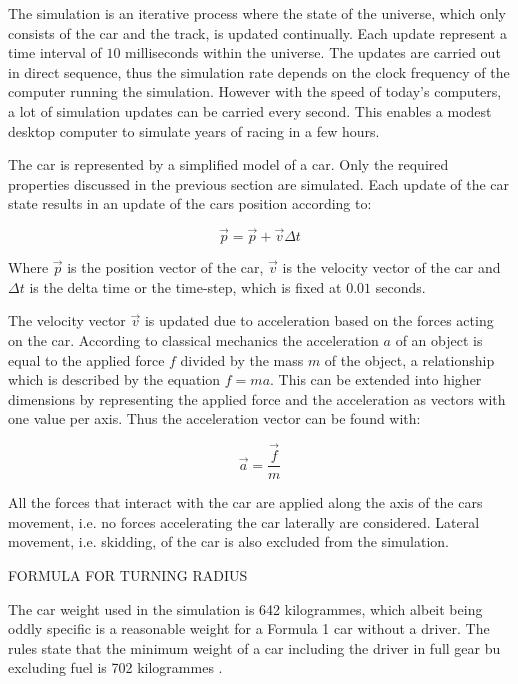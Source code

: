 The simulation is an iterative process where the state of the universe, which only consists of the car and the track, is updated continually. Each update represent a time interval of $10$ milliseconds within the universe. The updates are carried out in direct sequence, thus the simulation rate depends on the clock frequency of the computer running the simulation. However with the speed of today's computers, a lot of simulation updates can be carried every second. This enables a modest desktop computer to simulate years of racing in a few hours. 

The car is represented by a simplified model of a car. Only the required properties discussed in the previous section are simulated. Each update of the car state results in an update of the cars position according to:

\begin{equation}
    \vec{p} = \vec{p} + \vec{v}\Delta t 
\end{equation}

Where $\vec{p}$ is the position vector of the car, $\vec{v}$ is the velocity vector of the car and $\Delta t$ is the delta time or the time-step, which is fixed at $0.01$ seconds.

The velocity vector $\vec{v}$ is updated due to acceleration based on the forces acting on the car. According to classical mechanics the acceleration $a$ of an object is equal to the applied force $f$ divided by the mass $m$ of the object, a relationship which is described by the equation $f = ma$. This can be extended into higher dimensions by representing the applied force and the acceleration as vectors with one value per axis. Thus the acceleration vector can be found with:

\begin{equation}
    \vec{a} = \frac{\vec{f}}{m}  
\end{equation}

All the forces that interact with the car are applied along the axis of the cars movement, i.e. no forces accelerating the car laterally are considered. Lateral movement, i.e. skidding, of the car is also excluded from the simulation. 

FORMULA FOR TURNING RADIUS

The car weight used in the simulation is 642 kilogrammes, which albeit being oddly specific is a reasonable weight for a Formula 1 car without a driver. The rules state that the minimum weight of a car including the driver in full gear bu excluding fuel is 702 kilogrammes \cite{f1_weight}.

